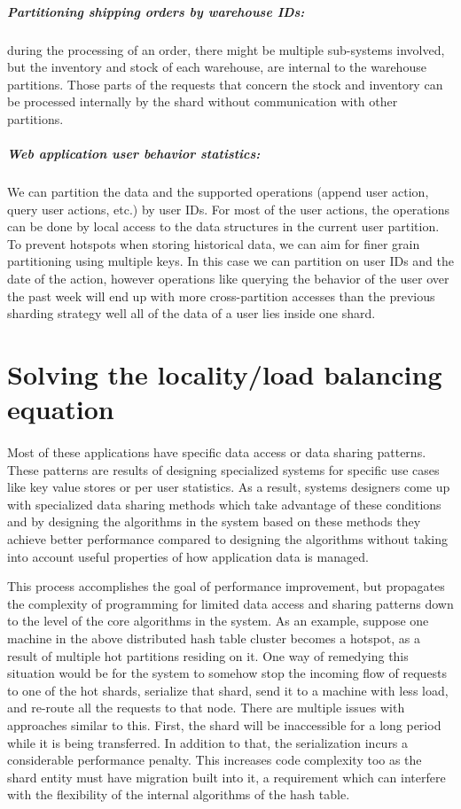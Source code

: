     \subparagraph{Partitioning shipping orders by warehouse IDs:} during the
    processing of an order, there might be multiple sub-systems involved,
    but the inventory and stock of each warehouse, are internal to
    the warehouse partitions. Those parts of the requests that concern the
    stock and inventory can be processed internally by the shard without
    communication with other partitions.

    \subparagraph{Web application user behavior statistics:} We can partition
    the data and the supported operations (append user action,
    query user actions, etc.) by user IDs.
    For most of
    the user actions, the operations can be done by local access to the
    data structures in the current user partition. To prevent hotspots when
    storing historical data, we can aim for finer grain partitioning using
    multiple keys. In this case we can
    partition on user IDs and the date of the action, however operations like
    querying the behavior of the user over the past
    week will end up with more cross-partition accesses than the previous
    sharding strategy well all of the data of a user lies inside one shard.


\section{Solving the locality/load balancing equation}
\paragraph{}
Most of these applications have specific data access or data sharing patterns.
These patterns are results of designing specialized systems for specific
use cases like key value stores or per user statistics.
As a result, systems designers come up with specialized data sharing methods
which take advantage of these conditions and by designing the algorithms
in the system based on these methods they achieve better performance compared
to designing the algorithms without taking into account useful properties of
how application data is managed.

This process accomplishes the goal of performance improvement, but propagates
the complexity of programming for limited data access and sharing patterns
down to the level of the core algorithms in the system. As an example, suppose
one machine in the above distributed hash table cluster becomes a hotspot,
as a result of multiple hot partitions residing on it. One way of
remedying this situation would be for the system to somehow stop the incoming
flow of requests to one of the hot shards, serialize that shard, send it to
a machine with less load, and re-route all the requests to that node. There
are multiple issues with approaches similar to this. First, the shard will be
inaccessible for a long period while it is being transferred. In addition
to that,
the serialization incurs a considerable performance penalty. This increases
code complexity too as the shard entity must have migration built into it,
a requirement which can interfere with the flexibility of the internal
algorithms of the hash table.

